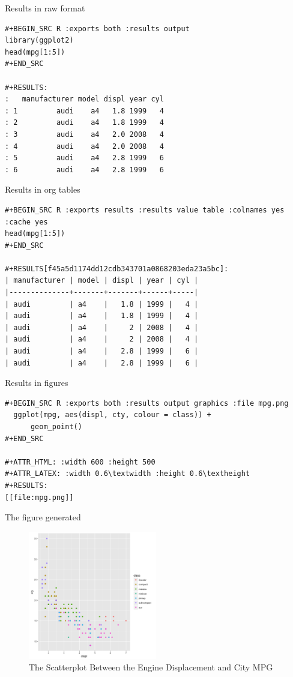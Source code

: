\documentclass[presentation]{beamer}
\begin{document}
\begin{frame}[fragile,label={sec:org08abd38}]{Results in raw format}
 \begin{verbatim}
#+BEGIN_SRC R :exports both :results output
library(ggplot2)
head(mpg[1:5])
#+END_SRC

#+RESULTS:
:   manufacturer model displ year cyl
: 1         audi    a4   1.8 1999   4
: 2         audi    a4   1.8 1999   4
: 3         audi    a4   2.0 2008   4
: 4         audi    a4   2.0 2008   4
: 5         audi    a4   2.8 1999   6
: 6         audi    a4   2.8 1999   6
\end{verbatim}
\end{frame}


\begin{frame}[fragile,label={sec:org738bc10}]{Results in org tables}
 \begin{verbatim}
#+BEGIN_SRC R :exports results :results value table :colnames yes :cache yes
head(mpg[1:5])
#+END_SRC

#+RESULTS[f45a5d1174dd12cdb343701a0868203eda23a5bc]:
| manufacturer | model | displ | year | cyl |
|--------------+-------+-------+------+-----|
| audi         | a4    |   1.8 | 1999 |   4 |
| audi         | a4    |   1.8 | 1999 |   4 |
| audi         | a4    |     2 | 2008 |   4 |
| audi         | a4    |     2 | 2008 |   4 |
| audi         | a4    |   2.8 | 1999 |   6 |
| audi         | a4    |   2.8 | 1999 |   6 |
\end{verbatim}
\end{frame}

\begin{frame}[fragile,label={sec:org045ad4f}]{Results in figures}
 \begin{verbatim}
#+BEGIN_SRC R :exports both :results output graphics :file mpg.png
  ggplot(mpg, aes(displ, cty, colour = class)) +
      geom_point()
#+END_SRC

#+ATTR_HTML: :width 600 :height 500
#+ATTR_LATEX: :width 0.6\textwidth :height 0.6\textheight
#+RESULTS:
[[file:mpg.png]]
\end{verbatim}
\end{frame}

\begin{frame}[label={sec:org3f8e3d6}]{The figure generated}
\begin{figure}[htbp]
\centering
\includegraphics[width=0.5\textwidth,height=0.5\textheight]{mpg.png}
\caption{The Scatterplot Between the Engine Displacement and City MPG}
\end{figure}
\end{frame}
\end{document}
